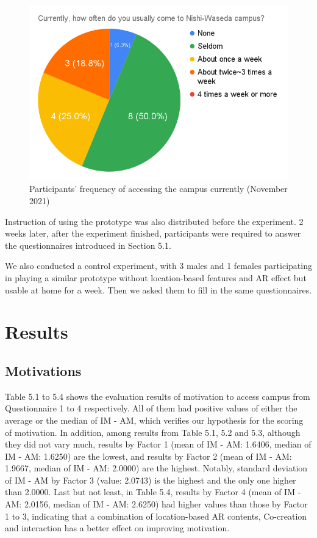 \begin{figure}[H]
  \centering
  \includegraphics[width=0.8\columnwidth]{resources/5_experiment_and_results/frequency_after_pandemic.png}
    \caption{Participants' frequency of accessing the campus currently (November 2021)}
\end{figure}

Instruction of using the prototype was also distributed before the experiment.
2 weeks later, after the experiment finished, participants were required to answer the questionnaires introduced in Section 5.1.

We also conducted a control experiment, with 3 males and 1 females participating in playing a similar prototype without location-based features and AR effect but usable at home for a week.
Then we asked them to fill in the same questionnaires.

\section{Results}
\subsection{Motivations}

Table 5.1 to 5.4 shows the evaluation results of motivation to access campus from Questionnaire 1 to 4 respectively.
All of them had positive values of either the average or the median of IM - AM, which verifies our hypothesis for the scoring of motivation.
In addition, among results from Table 5.1, 5.2 and 5.3, although they did not vary much, results by Factor 1 (mean of IM - AM: 1.6406, median of IM - AM: 1.6250) are the lowest,
and results by Factor 2 (mean of IM - AM: 1.9667, median of IM - AM: 2.0000) are the highest.
Notably, standard deviation of IM - AM by Factor 3 (value: 2.0743) is the highest and the only one higher than 2.0000.
Last but not least, in Table 5.4, results by Factor 4 (mean of IM - AM: 2.0156, median of IM - AM: 2.6250) had higher values than those by Factor 1 to 3, indicating that a combination of location-based AR contents, Co-creation and interaction has a better effect on improving motivation.

